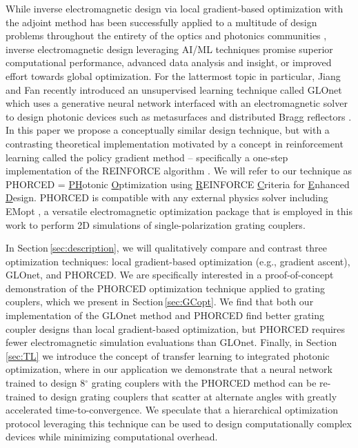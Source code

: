 \documentclass{article}
\begin{document}
While inverse electromagnetic design via local gradient-based optimization with the adjoint method has been successfully applied to a multitude of design problems throughout the entirety of the optics and photonics communities \cite{ jensen_topology_2011, lu_objective-first_2012, lalau-keraly_adjoint_2013, elesin_time_2014, piggott_inverse_2015,frellsen_topology_2016,  su_fully-automated_2017, michaels_leveraging_2018, michaels_inverse_2018, molesky_inverse_2018, hughes_adjoint_2018, liu_very_2018, andrade_inverse_2019, vercruysse_analytical_2019, augenstein_inverse_2020, bayati_inverse_2020,   hooten_adjoint_2020, jin_inverse_2018,jin_inverse_2020,  michaels_hierarchical_2020,  sun_adjoint-method-inspired_2020, lin_end--end_2021, omair_broadband_2021, vercruysse_inverse-designed_2021, zeng_inverse_2021}, inverse electromagnetic design leveraging AI/ML techniques promise superior computational performance, advanced data analysis and insight, or improved effort towards global optimization. For the lattermost topic in particular, Jiang and Fan recently introduced an unsupervised learning technique called GLOnet which uses a generative neural network interfaced with an electromagnetic solver to design photonic devices such as metasurfaces and distributed Bragg reflectors \cite{jiang_global_2019,jiang_simulator-based_2020,jiang_multiobjective_2020}. In this paper we propose a conceptually similar design technique, but with a contrasting theoretical implementation motivated by a concept in reinforcement learning called the policy gradient method -- specifically a one-step implementation of the REINFORCE algorithm \cite{williams_simple_1992, sutton_policy_2000}. We will refer to our technique as PHORCED = \underline{PH}otonic \underline{O}ptimization using \underline{R}EINFORCE \underline{C}riteria for \underline{E}nhanced \underline{D}esign. PHORCED is compatible with any external physics solver including EMopt \cite{michaels_emopt_2019}, a versatile electromagnetic optimization package that is employed in this work to perform 2D simulations of single-polarization grating couplers.

In Section\,\ref{sec:description}, we will qualitatively compare and contrast three optimization techniques: local gradient-based optimization (e.g., gradient ascent), GLOnet, and PHORCED. We are specifically interested in a proof-of-concept demonstration of the PHORCED optimization technique applied to grating couplers, which we present in Section\,\ref{sec:GCopt}. We find that both our implementation of the GLOnet method and PHORCED find better grating coupler designs than local gradient-based optimization, but PHORCED requires fewer electromagnetic simulation evaluations than GLOnet. Finally, in Section\,\ref{sec:TL} we introduce the concept of transfer learning to integrated photonic optimization, where in our application we demonstrate that a neural network trained to design 8$^\circ$ grating couplers with the PHORCED method can be re-trained to design grating couplers that scatter at alternate angles with greatly accelerated time-to-convergence. We speculate that a hierarchical optimization protocol leveraging this technique can be used to design computationally complex devices while minimizing computational overhead.
\end{document}
